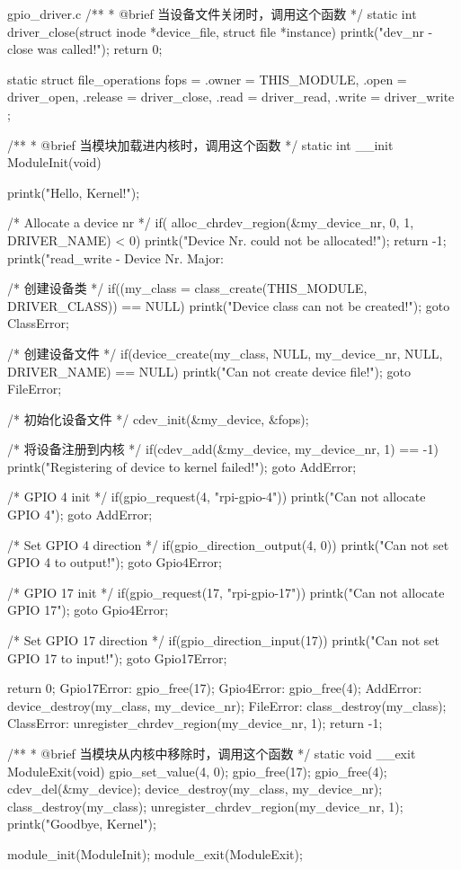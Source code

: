 \documentclass[lang=cn,newtx,10pt,scheme=chinese]{elegantbook}
\begin{document}
\begin{mycode}{gpio\_driver.c}
/**
 * @brief 当设备文件关闭时，调用这个函数
 */
static int driver_close(struct inode *device_file, struct file *instance) {
    printk("dev_nr - close was called!\n");
    return 0;
}

static struct file_operations fops = {
    .owner = THIS_MODULE,
    .open = driver_open,
    .release = driver_close,
    .read = driver_read,
    .write = driver_write
};

/**
 * @brief 当模块加载进内核时，调用这个函数
 */
static int __init ModuleInit(void) {
    printk("Hello, Kernel!\n");

    /* Allocate a device nr */
    if( alloc_chrdev_region(&my_device_nr, 0, 1, DRIVER_NAME) < 0) {
        printk("Device Nr. could not be allocated!\n");
        return -1;
    }
    printk("read_write - Device Nr. Major: %

    /* 创建设备类 */
    if((my_class = class_create(THIS_MODULE, DRIVER_CLASS)) == NULL) {
        printk("Device class can not be created!\n");
        goto ClassError;
    }

    /* 创建设备文件 */
    if(device_create(my_class, NULL, my_device_nr, NULL, DRIVER_NAME) == NULL) {
        printk("Can not create device file!\n");
        goto FileError;
    }

    /* 初始化设备文件 */
    cdev_init(&my_device, &fops);

    /* 将设备注册到内核 */
    if(cdev_add(&my_device, my_device_nr, 1) == -1) {
        printk("Registering of device to kernel failed!\n");
        goto AddError;
    }

    /* GPIO 4 init */
    if(gpio_request(4, "rpi-gpio-4")) {
        printk("Can not allocate GPIO 4\n");
        goto AddError;
    }

    /* Set GPIO 4 direction */
    if(gpio_direction_output(4, 0)) {
        printk("Can not set GPIO 4 to output!\n");
        goto Gpio4Error;
    }

    /* GPIO 17 init */
    if(gpio_request(17, "rpi-gpio-17")) {
        printk("Can not allocate GPIO 17\n");
        goto Gpio4Error;
    }

    /* Set GPIO 17 direction */
    if(gpio_direction_input(17)) {
        printk("Can not set GPIO 17 to input!\n");
        goto Gpio17Error;
    }


    return 0;
Gpio17Error:
    gpio_free(17);
Gpio4Error:
    gpio_free(4);
AddError:
    device_destroy(my_class, my_device_nr);
FileError:
    class_destroy(my_class);
ClassError:
    unregister_chrdev_region(my_device_nr, 1);
    return -1;
}

/**
 * @brief 当模块从内核中移除时，调用这个函数
 */
static void __exit ModuleExit(void) {
    gpio_set_value(4, 0);
    gpio_free(17);
    gpio_free(4);
    cdev_del(&my_device);
    device_destroy(my_class, my_device_nr);
    class_destroy(my_class);
    unregister_chrdev_region(my_device_nr, 1);
    printk("Goodbye, Kernel\n");
}

module_init(ModuleInit);
module_exit(ModuleExit);
\end{mycode}
\end{document}
